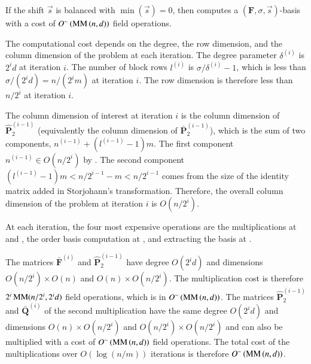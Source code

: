 \begin{thm}
\label{thm:balancedCost}If the shift $\vec{s}$ is balanced with
$\min\left(\vec{s}\right)=0$, then  computes
a $\left(\mathbf{F},\sigma,\vec{s}\right)$-basis with a cost of $O^{\sim}\left(\MM\left(n,d\right)\right)$
field operations.\end{thm}
\begin{pf}
The computational cost depends on the degree, the row dimension, and
the column dimension of the problem at each iteration. The degree
parameter $\delta^{\left(i\right)}$ is $2^{i}d$ at iteration $i$.
The number of block rows $l^{\left(i\right)}$ is $\sigma/\delta^{\left(i\right)}-1$,
which is less than $\sigma/(2^{i}d)=n/(2^{i}m)$ at iteration $i$.
The row dimension is therefore less than $n/2^{i}$ at iteration $i$.

The column dimension of interest at iteration $i$ is the column dimension
of $\hat{\mathbf{P}}_{2}^{\left(i-1\right)}$ (equivalently the column
dimension of $\bar{\mathbf{P}}_{2}^{\left(i-1\right)}$), which is
the sum of two components, $n^{\left(i-1\right)}+(l^{\left(i-1\right)}-1)m$.
The first component $n^{\left(i-1\right)}\in O(n/2^{i})$ by .
The second component $(l^{\left(i-1\right)}-1)m<n/2^{i-1}-m<n/2^{i-1}$
comes from the size of the identity matrix added in Storjohann's transformation.
Therefore, the overall column dimension of the problem at iteration
$i$ is $O(n/2^{i})$.

At each iteration, the four most expensive operations are the multiplications
at  and ,
the order basis computation at ,
and extracting the basis at .

The matrices $\bar{\mathbf{F}}^{\left(i\right)}$ and $\hat{\mathbf{P}}_{2}^{\left(i-1\right)}$
have degree $O(2^{i}d)$ and dimensions $O(n/2^{i})\times O\left(n\right)$
and $O\left(n\right)\times O(n/2^{i})$. The multiplication cost is
therefore $2^{i}\MM(n/2^{i},2^{i}d)$ field operations, which is in
$O^{\sim}\left(\MM\left(n,d\right)\right)$. The matrices $\hat{\mathbf{P}}_{2}^{\left(i-1\right)}$
and $\bar{\mathbf{Q}}^{\left(i\right)}$ of the second multiplication
have the same degree $O(2^{i}d)$ and dimensions $O\left(n\right)\times O(n/2^{i})$
and $O(n/2^{i})\times O(n/2^{i})$ and can also be multiplied with
a cost of $O^{\sim}\left(\MM\left(n,d\right)\right)$ field operations.
The total cost of the multiplications over $O(\log\left(n/m\right))$
iterations is therefore $O^{\sim}\left(\MM\left(n,d\right)\right)$.


\end{pf}

